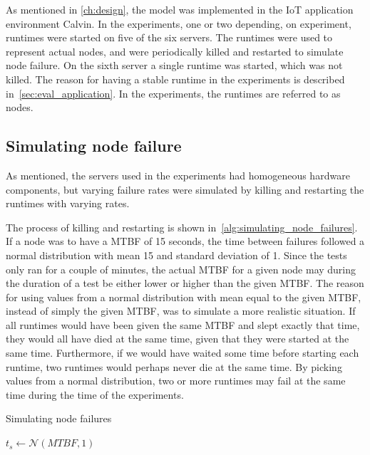 \documentclass{cslthse-msc}
\begin{document}
As mentioned in \cref{ch:design}, the model was implemented in the IoT application environment Calvin. In the experiments, one or two depending, on experiment, runtimes were started on five of the six servers. The runtimes were used to represent actual nodes, and were periodically killed and restarted to simulate node failure. On the sixth server a single runtime was started, which was not killed. The reason for having a stable runtime in the experiments is described in~\cref{sec:eval_application}. In the experiments, the runtimes are referred to as nodes.

\subsection{Simulating node failure} \label{sec:simulating_node_failure}
As mentioned, the servers used in the experiments had homogeneous hardware components, but varying failure rates were simulated by killing and restarting the runtimes with varying rates.

The process of killing and restarting is shown in~\cref{alg:simulating_node_failures}. If a node was to have a MTBF of 15 seconds, the time between failures followed a normal distribution with mean 15 and standard deviation of 1. Since the tests only ran for a couple of minutes, the actual MTBF for a given node may during the duration of a test be either lower or higher than the given MTBF. The reason for using values from a normal distribution with mean equal to the given MTBF, instead of simply the given MTBF, was to simulate a more realistic situation. If all runtimes would have been given the same MTBF and slept exactly that time, they would all have died at the same time, given that they were started at the same time. Furthermore, if we would have waited some time before starting each runtime, two runtimes would perhaps never die at the same time. By picking values from a normal distribution, two or more runtimes may fail at the same time during the time of the experiments.

\begin{algorithm} 
	\caption{Simulating node failures} \label{alg:simulating_node_failures}
	\begin{algorithmic}[1]
		\State
		\State $t_{s}\gets \mathcal{N} (MTBF,1)$
		\State
		\State
	\EndWhile
	\end{algorithmic}
\end{algorithm}
\end{document}
